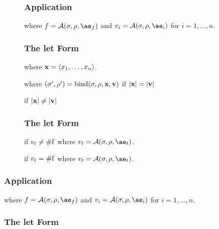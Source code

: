 \begin{figure*}
\subsubsection{Application}

\noindent
{}
where $f=\A{\sigma}{\rho}{\ae_f}$ and $v_i=\A{\sigma}{\rho}{\ae_i}$ for $i=1,\dots,n$.

\subsubsection{The let Form}

\noindent
{} where $\mathbf{x}=\langle x_1,\dots,x_n\rangle$.

where $(\sigma',\rho')=\mathrm{bind}(\sigma,\rho,\mathbf{x},\mathbf{v})$ if $|\mathbf{x}|=|\mathbf{v}|$

if $|\mathbf{x}|\ne|\mathbf{v}|$

\subsubsection{The let Form}

if $v_t\ne\mathrm{\#f}$
where $v_t=\A{\sigma}{\rho}{\ae_t}$.

if $v_t=\mathrm{\#f}$
where $v_t=\A{\sigma}{\rho}{\ae_t}$.
\end{figure*}





\subsubsection{Application}

\noindent
{}

\noindent
where $f=\A{\sigma}{\rho}{\ae_f}$ and $v_i=\A{\sigma}{\rho}{\ae_i}$ for $i=1,\dots,n$.

\subsubsection{The let Form}

